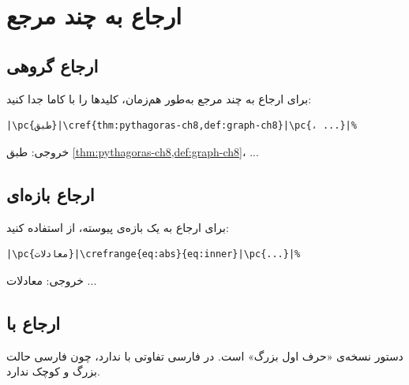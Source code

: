 
\section{ارجاع به چند مرجع}
\label{sec:cross-refs-multiple}

\subsection{ارجاع گروهی}
\label{sec:cross-refs-group}

برای ارجاع به چند مرجع به‌طور هم‌زمان، کلیدها
را با کاما جدا کنید:

\begin{latin}
\begin{verbatim}
|\pc{طبق}|\cref{thm:pythagoras-ch8,def:graph-ch8}|\pc{، ...}|%
\end{verbatim}
\end{latin}

خروجی: طبق \cref{thm:pythagoras-ch8,def:graph-ch8}، ...


\subsection{ارجاع بازه‌ای}
\label{sec:cross-refs-range}

برای ارجاع به یک بازه‌ی پیوسته، از
 استفاده کنید:

\begin{latin}
\begin{verbatim}
|\pc{معادلات}|\crefrange{eq:abs}{eq:inner}|\pc{...}|%
\end{verbatim}
\end{latin}

خروجی: معادلات ...


\subsection{ارجاع با }
\label{sec:cross-refs-Cref}

دستور  نسخه‌ی «حرف اول بزرگ» است.
در فارسی تفاوتی با  ندارد، چون
فارسی حالت بزرگ و کوچک ندارد.

